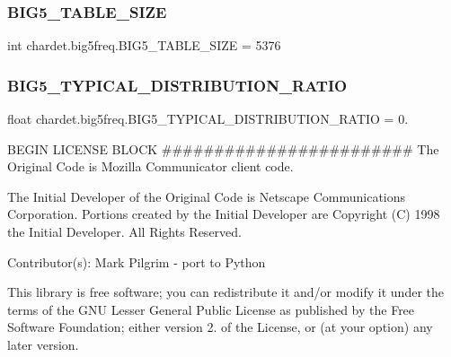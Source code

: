 \mbox{\label{namespacechardet_1_1big5freq_a47232451e4e49681291711b60c4dce37}} 
\subsubsection{\texorpdfstring{B\+I\+G5\+\_\+\+T\+A\+B\+L\+E\+\_\+\+S\+I\+ZE}{BIG5\_TABLE\_SIZE}}
{\footnotesize\ttfamily int chardet.\+big5freq.\+B\+I\+G5\+\_\+\+T\+A\+B\+L\+E\+\_\+\+S\+I\+ZE = 5376}

\mbox{\label{namespacechardet_1_1big5freq_a5b9317a9f401350cd7b9a995974f6921}} 
\subsubsection{\texorpdfstring{B\+I\+G5\+\_\+\+T\+Y\+P\+I\+C\+A\+L\+\_\+\+D\+I\+S\+T\+R\+I\+B\+U\+T\+I\+O\+N\+\_\+\+R\+A\+T\+IO}{BIG5\_TYPICAL\_DISTRIBUTION\_RATIO}}
{\footnotesize\ttfamily float chardet.\+big5freq.\+B\+I\+G5\+\_\+\+T\+Y\+P\+I\+C\+A\+L\+\_\+\+D\+I\+S\+T\+R\+I\+B\+U\+T\+I\+O\+N\+\_\+\+R\+A\+T\+IO = 0.}



B\+E\+G\+IN L\+I\+C\+E\+N\+SE B\+L\+O\+CK \#\#\#\#\#\#\#\#\#\#\#\#\#\#\#\#\#\#\#\#\#\#\#\# The Original Code is Mozilla Communicator client code. 

The Initial Developer of the Original Code is Netscape Communications Corporation. Portions created by the Initial Developer are Copyright (C) 1998 the Initial Developer. All Rights Reserved.

Contributor(s)\+: Mark Pilgrim -\/ port to Python

This library is free software; you can redistribute it and/or modify it under the terms of the G\+NU Lesser General Public License as published by the Free Software Foundation; either version 2. of the License, or (at your option) any later version.

